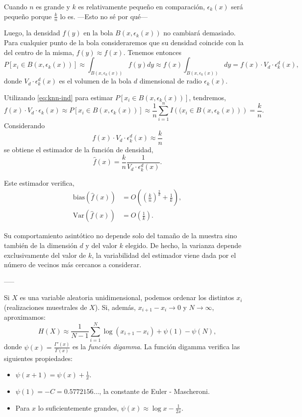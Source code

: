 \documentclass[10pt,a4paper]{article} %
\newcommand{\bias}{\text{bias}}
\newcommand{\Var}{\text{Var}}
\theoremstyle{definition}
\begin{document}
Cuando $n$ es grande y $k$ es relativamente pequeño en comparación, $\epsilon_k(x)$ será pequeño porque $\frac{k}{n}$ lo es.
---Esto no sé por qué---

Luego, la densidad $f(y)$ en la bola $B(x,\epsilon_k(x))$ no cambiará demasiado. Para cualquier punto de la bola consideraremos que su densidad coincide con la del centro de la misma, $f(y)\approx f(x)$. Tenemos entonces\[
P[x_i\in B(x,\epsilon_k(x))] \approx \int_{B(x,\epsilon_k(x))}f(y)dy\approx f(x) \int_{B(x,\epsilon_k(x))}dy = f(x)\cdot V_d \cdot \epsilon^d_k(x),
\]
donde $V_d\cdot \epsilon^d_k(x)$ es el volumen de la bola $d$ dimensional de radio $\epsilon_k(x)$.

Utilizando \ref{eq:knn-ind} para estimar $P[x_i\in B(x,\epsilon_k(x))]$, tendremos,\[
f(x)\cdot V_d \cdot \epsilon_k(x) \approx P[x_i\in B(x,\epsilon_k(x))]\approx  \frac{1}{n} \sum_{i=1}^nI\left((x_i\in B\left(x,\epsilon_k(x)\right)\right) = \frac{k}{n}.
\]
Considerando\[
f(x)\cdot V_d \cdot \epsilon^d_k(x) \approx \frac{k}{n}
\]
se obtiene el estimador de la función de densidad, \[
\hat{f}(x) = \frac{k}{n}\frac{1}{V_d \cdot \epsilon^d_k(x)}.
\]

Este estimador verifica,
\begin{align*}
  \bias\left(\hat{f}(x)\right) &= O \left(\left(\frac{k}{n}\right)^{\frac{2}{d}} + \frac{1}{k}\right),\\
  \Var\left(\hat{f}(x)\right) &= O \left(\frac{1}{k}\right).
\end{align*}

Su comportamiento asintótico no depende solo del tamaño de la muestra sino también de la dimensión $d$ y del valor $k$ elegido. De hecho, la varianza depende exclusivamente del valor de $k$, la variabilidad del estimador viene dada por el número de vecinos más cercanos a considerar. 

-----

Si $X$ es una variable aleatoria unidimensional, podemos ordenar los distintos $x_i$ (realizaciones muestrales de $X$). Si, además, $x_{i+1} -x_i \to 0$ y $N\to \infty$, aproximamos:\[
H(X)\approx \frac{1}{N-1}\sum_{i=1}^N \log(x_{i+1}-x_i) + \psi(1) - \psi(N),\]
donde $\psi(x) = \frac{\Gamma'(x)}{\Gamma(x)}$ es la \textit{función digamma}. La función digamma verifica las siguientes propiedades:
\begin{itemize}
\item $\psi(x+1) = \psi(x) + \frac{1}{x}$.
\item $\psi(1) = -C = 0.5772156\dots$, la constante de Euler - Mascheroni.
  \item Para $x$ lo suficientemente grandes, $\psi(x) \approx \log x - \frac{1}{2x}$.
\end{itemize}
\end{document}
